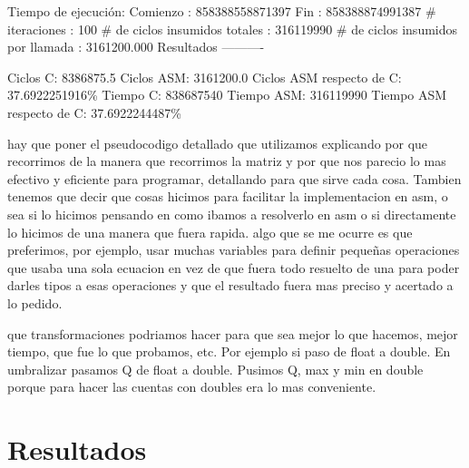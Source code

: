 \documentclass[10pt, a4paper]{article}
\begin{document}
\begin{itemize}
Tiempo de ejecución:\newline
  Comienzo                          : 858388558871397\newline
  Fin                               : 858388874991387\newline
  \# iteraciones                     : 100\newline
  \# de ciclos insumidos totales     : 316119990\newline
  \# de ciclos insumidos por llamada : 3161200.000\newline
\newline
Resultados\newline
----------\newline

Ciclos C:                 8386875.5\newline
Ciclos ASM:               3161200.0\newline
Ciclos ASM respecto de C: 37.6922251916\%\newline
Tiempo C:                 838687540\newline
Tiempo ASM:               316119990\newline
Tiempo ASM respecto de C: 37.6922244487\%\newline


\end{itemize}

hay que poner el pseudocodigo detallado que utilizamos explicando por que recorrimos de la manera que recorrimos la matriz y por que nos parecio lo mas efectivo y eficiente para programar, detallando para que sirve cada cosa. Tambien tenemos que decir que cosas hicimos para facilitar la implementacion en asm, o sea si lo hicimos pensando en como ibamos a resolverlo en asm o si directamente lo hicimos de una manera que fuera rapida. algo que se me ocurre es que preferimos, por ejemplo, usar muchas variables para definir pequeñas operaciones que usaba una sola ecuacion en vez de que fuera todo resuelto de una para poder darles tipos a esas operaciones y que el resultado fuera mas preciso y acertado a lo pedido.\newline

que transformaciones podriamos hacer para que sea mejor lo que hacemos, mejor tiempo, que fue lo que probamos, etc. Por ejemplo si paso de float a double. En umbralizar pasamos Q de float a double. Pusimos Q, max y min en double porque para hacer las cuentas con doubles era lo mas conveniente.
\newline
\section{Resultados}
\end{document}
